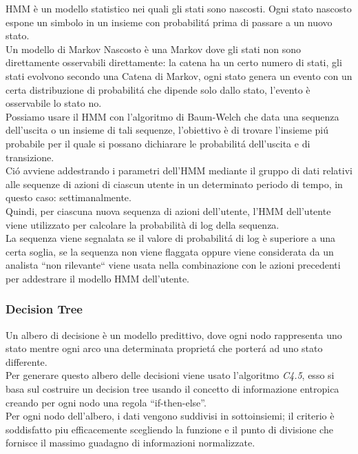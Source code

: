 \documentclass[../tesi.tex]{subfiles}
\begin{document}
HMM è un modello statistico nei quali gli stati sono nascosti. Ogni stato nascosto espone un simbolo in un insieme con probabilitá prima di passare a un nuovo stato.\\
Un modello di Markov Nascosto è una \Gls{Markov} dove gli stati non sono direttamente osservabili direttamente: la catena ha un certo numero di stati, gli stati evolvono secondo una Catena di Markov, ogni stato genera un evento con un certa distribuzione di probabilitá che dipende solo dallo stato, l’evento è osservabile lo stato no.\\
Possiamo usare il HMM con l’algoritmo di Baum-Welch che data una sequenza dell’uscita o un insieme di tali sequenze, l’obiettivo è di trovare l’insieme piú probabile per il quale si possano dichiarare le probabilitá dell’uscita e di transizione.\\
Ció avviene addestrando i parametri dell’HMM mediante il gruppo di dati relativi alle sequenze di azioni di ciascun utente in un determinato periodo di tempo, in questo caso: settimanalmente.\\
Quindi, per ciascuna nuova sequenza di azioni dell'utente, l'HMM dell'utente viene utilizzato per calcolare la probabilità di log della sequenza.\\
La sequenza viene segnalata se il valore di probabilitá di log è superiore a una certa soglia, se la sequenza non viene flaggata oppure viene considerata da un analista “non rilevante`` viene usata nella combinazione con le azioni precedenti per addestrare il modello HMM dell’utente.

\subsubsection{Decision Tree}

Un albero di decisione è un modello predittivo, dove ogni nodo rappresenta uno stato mentre ogni arco una determinata proprietá che porterá ad uno stato differente.\\
Per generare questo albero delle decisioni viene usato l’algoritmo \textit{C4.5}, esso si basa sul costruire un decision tree usando il concetto di informazione entropica creando per ogni nodo una regola “if-then-else”.\\
Per ogni nodo dell’albero, i dati vengono suddivisi in sottoinsiemi; il criterio è soddisfatto piu efficacemente scegliendo la funzione e il punto di divisione che fornisce il massimo guadagno di informazioni normalizzate.
\end{document}
